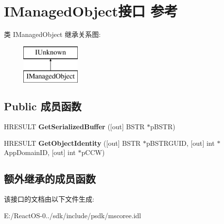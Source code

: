 \hypertarget{interface_i_managed_object}{}\section{I\+Managed\+Object接口 参考}
\label{interface_i_managed_object}
类 I\+Managed\+Object 继承关系图\+:\begin{figure}[H]
\begin{center}
\leavevmode
\includegraphics[height=2.000000cm]{interface_i_managed_object}
\end{center}
\end{figure}
\subsection*{Public 成员函数}
\begin{DoxyCompactItemize}
\item 
\mbox{\label{interface_i_managed_object_ab0b4aa87596b30de576c0a41230d5c31}} 
H\+R\+E\+S\+U\+LT {\bfseries Get\+Serialized\+Buffer} (\mbox{[}out\mbox{]} B\+S\+TR $\ast$p\+B\+S\+TR)
\item 
\mbox{\label{interface_i_managed_object_a5dde19d5d751435d953eaef9e9dd39f8}} 
H\+R\+E\+S\+U\+LT {\bfseries Get\+Object\+Identity} (\mbox{[}out\mbox{]} B\+S\+TR $\ast$p\+B\+S\+T\+R\+G\+U\+ID, \mbox{[}out\mbox{]} int $\ast$App\+Domain\+ID, \mbox{[}out\mbox{]} int $\ast$p\+C\+CW)
\end{DoxyCompactItemize}
\subsection*{额外继承的成员函数}


该接口的文档由以下文件生成\+:\begin{DoxyCompactItemize}
\item 
E\+:/\+React\+O\+S-\/0../sdk/include/psdk/mscoree.\+idl\end{DoxyCompactItemize}
